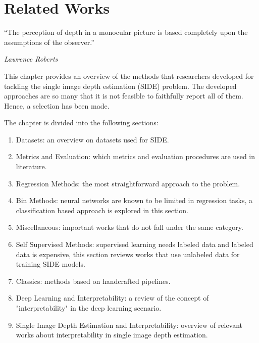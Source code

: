 \chapter{Related Works}
\label{ch:sota}

\epigraph{\enquote{The perception of depth in a monocular picture is based completely upon the assumptions of the observer.}}{\emph{Lawrence Roberts}}

This chapter provides an overview of the methods that researchers developed for tackling the single image depth estimation (SIDE) problem.
The developed approaches are so many that it is not feasible to faithfully report all of them.
Hence, a selection has been made.

The chapter is divided into the following sections:
\begin{enumerate}
    \item{Datasets: an overview on datasets used for SIDE.}
    \item{Metrics and Evaluation: which metrics and evaluation procedures are used in literature.}
    \item{Regression Methods: the most straightforward approach to the problem.}
    \item{Bin Methods: neural networks are known to be limited in regression tasks, a classification based approach is explored in this section.}
    \item{Miscellaneous: important works that do not fall under the same category.}
    \item{Self Supervised Methods: supervised learning needs labeled data and labeled data is expensive, this section reviews works that use unlabeled data for training SIDE models.}
    \item{Classics: methods based on handcrafted pipelines.}
    \item{Deep Learning and Interpretability: a review of the concept of "interpretability" in the deep learning scenario.}
    \item{Single Image Depth Estimation and Interpretability: overview of relevant works about interpretability in single image depth estimation.}
\end{enumerate}









